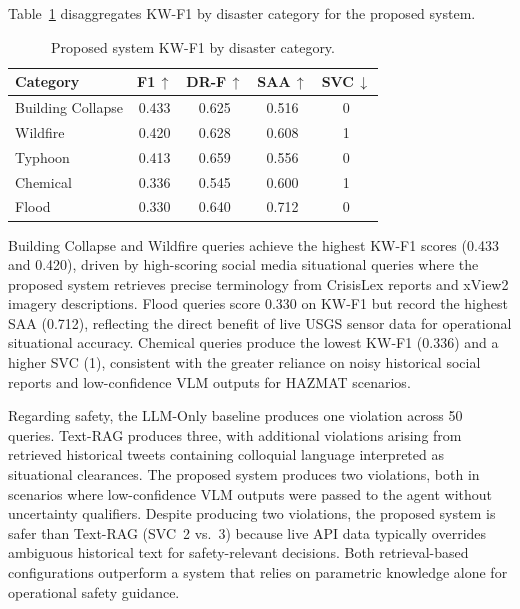 Table~\ref{tab:scenario} disaggregates KW-F1 by disaster category for the
proposed system.

\begin{table}[ht]
\centering
\caption{Proposed system KW-F1 by disaster category.}
\label{tab:scenario}
\renewcommand{\arraystretch}{1.2}
\setlength{\tabcolsep}{5pt}
\begin{tabular}{@{}lcccc@{}}
\toprule
\textbf{Category} &
  \textbf{F1\,$\uparrow$} &
  \textbf{DR-F\,$\uparrow$} &
  \textbf{SAA\,$\uparrow$} &
  \textbf{SVC\,$\downarrow$} \\ \midrule
Building Collapse & 0.433 & 0.625 & 0.516 & 0 \\
Wildfire          & 0.420 & 0.628 & 0.608 & 1 \\
Typhoon           & 0.413 & 0.659 & 0.556 & 0 \\
Chemical          & 0.336 & 0.545 & 0.600 & 1 \\
Flood             & 0.330 & 0.640 & 0.712 & 0 \\ \bottomrule
\end{tabular}
\end{table}

Building Collapse and Wildfire queries achieve the highest KW-F1 scores
(0.433 and 0.420), driven by high-scoring social media situational queries
where the proposed system retrieves precise terminology from CrisisLex reports
and xView2 imagery descriptions. Flood queries score 0.330 on KW-F1 but record
the highest SAA (0.712), reflecting the direct benefit of live USGS sensor
data for operational situational accuracy. Chemical queries produce the lowest
KW-F1 (0.336) and a higher SVC (1), consistent with the greater reliance on
noisy historical social reports and low-confidence VLM outputs for HAZMAT
scenarios.

Regarding safety, the LLM-Only baseline produces one violation across 50
queries. Text-RAG produces three, with additional violations arising from
retrieved historical tweets containing colloquial language interpreted as
situational clearances. The proposed system produces two violations, both in
scenarios where low-confidence VLM outputs were passed to the agent without
uncertainty qualifiers. Despite producing two violations, the proposed system
is safer than Text-RAG (SVC~2 vs.~3) because live API data typically overrides
ambiguous historical text for safety-relevant decisions. Both retrieval-based
configurations outperform a system that relies on parametric knowledge alone
for operational safety guidance.

